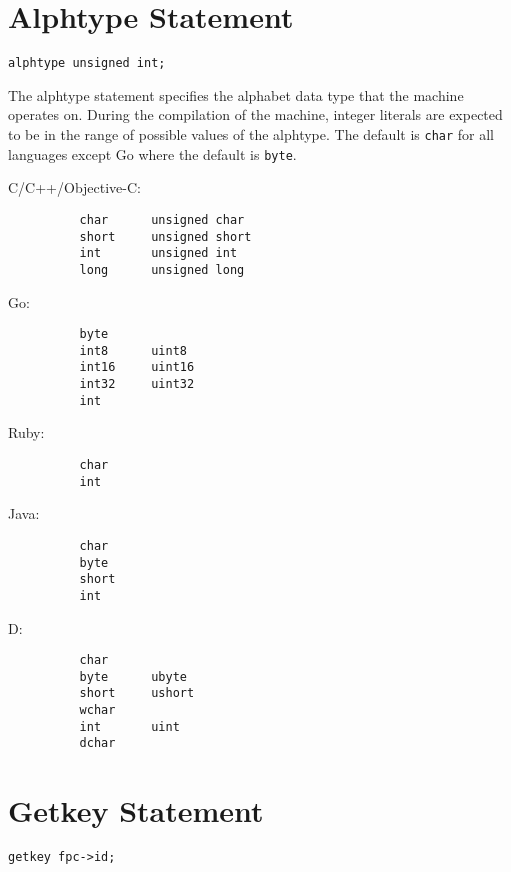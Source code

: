 \documentclass[letterpaper,11pt,oneside]{book}
\newcommand{\verbspace}{\vspace{10pt}}
\begin{document}
\section{Alphtype Statement}

\begin{verbatim}
alphtype unsigned int;
\end{verbatim}
\verbspace

The alphtype statement specifies the alphabet data type that the machine
operates on. During the compilation of the machine, integer literals are
expected to be in the range of possible values of the alphtype. The default
is \verb|char| for all languages except Go where the default is \verb|byte|.

\begin{multicols}{2}
C/C++/Objective-C:
\begin{verbatim}
          char      unsigned char      
          short     unsigned short
          int       unsigned int
          long      unsigned long
\end{verbatim}
\verbspace

Go:
\begin{verbatim}
          byte
          int8      uint8
          int16     uint16
          int32     uint32
          int
\end{verbatim}
\verbspace

Ruby: 
\begin{verbatim}
          char 
          int
\end{verbatim}
\verbspace

\columnbreak

Java:
\begin{verbatim}
          char 
          byte 
          short 
          int
\end{verbatim}
\verbspace

D:
\begin{verbatim}
          char 
          byte      ubyte   
          short     ushort 
          wchar 
          int       uint 
          dchar
\end{verbatim}
\verbspace

\end{multicols}

\section{Getkey Statement}

\begin{verbatim}
getkey fpc->id;
\end{verbatim}
\verbspace
\end{document}

